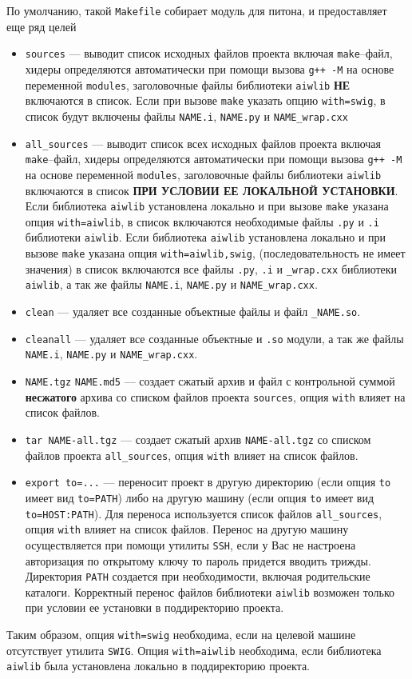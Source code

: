 По умолчанию, такой \verb'Makefile' собирает модуль для питона, и предоставляет еще ряд целей
\begin{itemize}
\item \verb'sources' --- выводит список исходных файлов проекта включая \verb'make'--файл, хидеры определяются автоматически 
при помощи вызова \verb'g++ -M' на основе переменной \verb'modules', заголовочные файлы библиотеки \verb'aiwlib' 
{\bf НЕ} включаются в список. Если при вызове \verb'make' указать опцию \verb'with=swig', в список будут включены файлы 
\verb'NAME.i', \verb'NAME.py' и \verb'NAME_wrap.cxx'
\item \verb'all_sources' --- выводит список всех исходных файлов проекта включая \verb'make'--файл, 
хидеры определяются автоматически 
при помощи вызова \verb'g++ -M' на основе переменной \verb'modules', заголовочные файлы библиотеки \verb'aiwlib' 
включаются в список {\bf ПРИ УСЛОВИИ ЕЕ ЛОКАЛЬНОЙ УСТАНОВКИ}. 
Если библиотека \verb'aiwlib' установлена локально и при вызове \verb'make' указана опция \verb'with=aiwlib', в список включаются  
необходимые файлы \verb'.py' и \verb'.i' библиотеки \verb'aiwlib'.
Если библиотека \verb'aiwlib' установлена локально и при вызове \verb'make' указана опция \verb'with=aiwlib,swig',
(последовательность не имеет значения) в список включаются
все файлы \verb'.py', \verb'.i' и \verb'_wrap.cxx' библиотеки \verb'aiwlib', а так же файлы 
\verb'NAME.i', \verb'NAME.py' и \verb'NAME_wrap.cxx'.
\item \verb'clean' --- удаляет все созданные объектные файлы и файл \verb'_NAME.so'.
\item \verb'cleanall' --- удаляет все созданные объектные и \verb'.so' модули, а так же файлы 
\verb'NAME.i', \verb'NAME.py' и \verb'NAME_wrap.cxx'.
\item \verb'NAME.tgz' \verb'NAME.md5' --- создает сжатый архив и файл с контрольной суммой {\bf несжатого} архива
со списком файлов  проекта \verb'sources', опция \verb'with' влияет на список файлов.
\item \verb'tar NAME-all.tgz' --- создает сжатый архив \verb'NAME-all.tgz'
со списком файлов  проекта \verb'all_sources', опция \verb'with' влияет на список файлов.
\item \verb'export to=...' --- переносит проект в другую директорию (если опция \verb'to' имеет вид \verb'to=PATH')
либо на другую машину (если опция \verb'to' имеет вид \verb'to=HOST:PATH'). Для переноса используется список 
файлов \verb'all_sources', опция \verb'with' влияет на список файлов. Перенос на другую машину осуществляется при помощи 
утилиты \verb'SSH', если у Вас не настроена авторизация по открытому ключу то пароль придется вводить трижды.
Директория \verb'PATH' создается при необходимости, включая родительские каталоги.
Корректный перенос файлов библиотеки \verb'aiwlib' возможен только при условии ее установки в поддиректорию проекта.
\end{itemize}
Таким образом, опция \verb'with=swig' необходима, если на целевой машине отсутствует утилита \verb'SWIG'. Опция \verb'with=aiwlib'
необходима, если библиотека \verb'aiwlib' была установлена локально в поддиректорию проекта.

